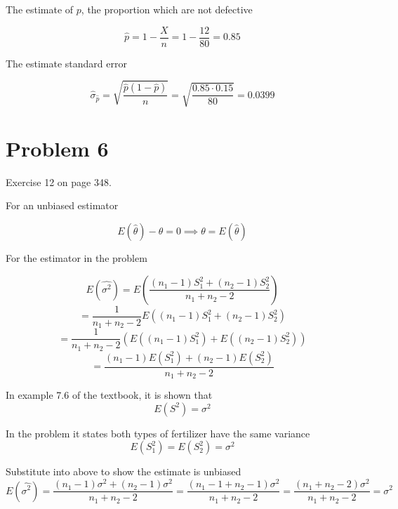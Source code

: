 \documentclass[a4paper,11pt]{article}
\begin{document}
The estimate of $p$, the proportion which are not defective

\[ \hat{p} = 1 - \frac{X}{n} = 1 - \frac{12}{80} = 0.85 \]

The estimate standard error

\[ \hat{\sigma}_{\hat{p}} = \sqrt{\frac{\hat{p}(1 - \hat{p})}{n}} = \sqrt{\frac{0.85 \cdot 0.15}{80}} = 0.0399\]

\clearpage

\section*{Problem 6}

Exercise 12 on page 348.


For an unbiased estimator

\[ E(\hat{\theta}) - \theta = 0 \implies \theta = E(\hat{\theta}) \]

For the estimator in the problem

\[ E(\hat{\sigma^2}) = E\left( \frac{(n_1 - 1)S_1^2 + (n_2 - 1)S_2^2}{n_1 + n_2 - 2} \right) \]
\[ = \frac{1}{n_1 + n_2 - 2}E\left((n_1 - 1)S_1^2 + (n_2 - 1)S_2^2 \right) \]
\[ = \frac{1}{n_1 + n_2 - 2} \left(E((n_1 - 1)S_1^2) + E((n_2 - 1)S_2^2) \right) \]
\[ = \frac{(n_1 - 1)E(S_1^2) + (n_2 - 1)E(S_2^2)}{n_1 + n_2 - 2} \]

\vspace{1cm}
In example 7.6 of the textbook, it is shown that
\[ E(S^2) = \sigma^2 \]

In the problem it states both types of fertilizer have the same variance
\[ E(S_1^2) = E(S_2^2) = \sigma^2 \]

\vspace{5mm}
Substitute into above to show the estimate is unbiased
\[ E(\hat{\sigma^2}) = \frac{(n_1 - 1)\sigma^2 + (n_2 - 1)\sigma^2}{n_1 + n_2 - 2} = \frac{(n_1 - 1 + n_2 - 1)\sigma^2}{n_1 + n_2 - 2} = \frac{(n_1 + n_2 - 2)\sigma^2}{n_1 + n_2 - 2} = \sigma^2 \]
\end{document}
